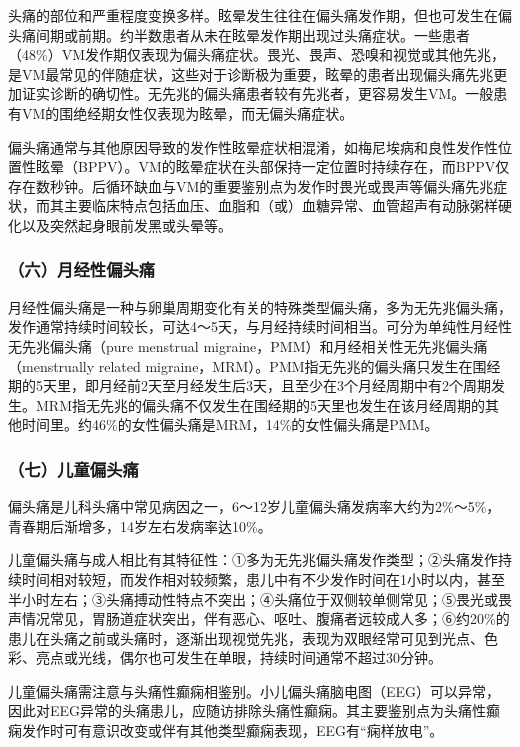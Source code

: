 头痛的部位和严重程度变换多样。眩晕发生往往在偏头痛发作期，但也可发生在偏头痛间期或前期。约半数患者从未在眩晕发作期出现过头痛症状。一些患者（48\%）VM发作期仅表现为偏头痛症状。畏光、畏声、恐嗅和视觉或其他先兆，是VM最常见的伴随症状，这些对于诊断极为重要，眩晕的患者出现偏头痛先兆更加证实诊断的确切性。无先兆的偏头痛患者较有先兆者，更容易发生VM。一般患有VM的围绝经期女性仅表现为眩晕，而无偏头痛症状。

偏头痛通常与其他原因导致的发作性眩晕症状相混淆，如梅尼埃病和良性发作性位置性眩晕（BPPV）。VM的眩晕症状在头部保持一定位置时持续存在，而BPPV仅存在数秒钟。后循环缺血与VM的重要鉴别点为发作时畏光或畏声等偏头痛先兆症状，而其主要临床特点包括血压、血脂和（或）血糖异常、血管超声有动脉粥样硬化以及突然起身眼前发黑或头晕等。

\subsubsection{（六）月经性偏头痛}

月经性偏头痛是一种与卵巢周期变化有关的特殊类型偏头痛，多为无先兆偏头痛，发作通常持续时间较长，可达4～5天，与月经持续时间相当。可分为单纯性月经性无先兆偏头痛（pure
menstrual migraine，PMM）和月经相关性无先兆偏头痛（menstrually related
migraine，MRM）。PMM指无先兆的偏头痛只发生在围经期的5天里，即月经前2天至月经发生后3天，且至少在3个月经周期中有2个周期发生。MRM指无先兆的偏头痛不仅发生在围经期的5天里也发生在该月经周期的其他时间里。约46\%的女性偏头痛是MRM，14\%的女性偏头痛是PMM。

\subsubsection{（七）儿童偏头痛}

偏头痛是儿科头痛中常见病因之一，6～12岁儿童偏头痛发病率大约为2\%～5\%，青春期后渐增多，14岁左右发病率达10\%。

儿童偏头痛与成人相比有其特征性：①多为无先兆偏头痛发作类型；②头痛发作持续时间相对较短，而发作相对较频繁，患儿中有不少发作时间在1小时以内，甚至半小时左右；③头痛搏动性特点不突出；④头痛位于双侧较单侧常见；⑤畏光或畏声情况常见，胃肠道症状突出，伴有恶心、呕吐、腹痛者远较成人多；⑥约20\%的患儿在头痛之前或头痛时，逐渐出现视觉先兆，表现为双眼经常可见到光点、色彩、亮点或光线，偶尔也可发生在单眼，持续时间通常不超过30分钟。

儿童偏头痛需注意与头痛性癫痫相鉴别。小儿偏头痛脑电图（EEG）可以异常，因此对EEG异常的头痛患儿，应随访排除头痛性癫痫。其主要鉴别点为头痛性癫痫发作时可有意识改变或伴有其他类型癫痫表现，EEG有“痫样放电”。

